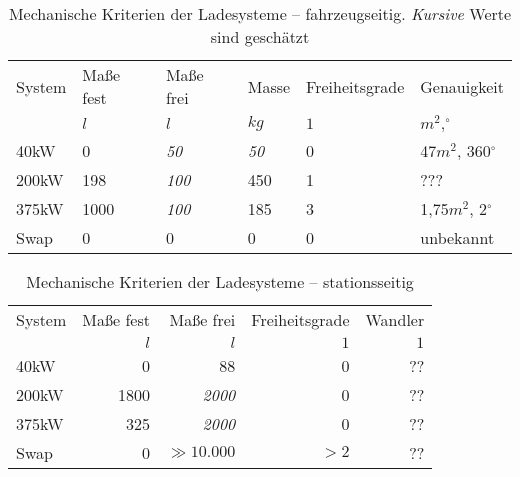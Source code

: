 \begin{table}[h!]\centering
	\begin{tabularx}{\linewidth}{Xlllll}
		\toprule
		System & Maße fest & Maße frei  & Masse     & Freiheitsgrade & Genauigkeit            \\
		       & $l$       & $l$        & $kg$      & $1$            & $m^2,^{\circ}$         \\ \midrule
		40kW   & 0         & \emph{50}  & \emph{50} & 0              & 47$m^2$, 360$^{\circ}$ \\
		200kW  & 198       & \emph{100} & 450       & 1              & ???                    \\
		375kW  & 1000      & \emph{100} & 185       & 3              & 1,75$m^2$, 2$^{\circ}$ \\
		Swap   & 0         & 0          & 0         & 0              & unbekannt             \\ \bottomrule
	\end{tabularx}
	\caption[Mechanische Kriterien der Ladesysteme – fahrzeugseitig]{Mechanische Kriterien der Ladesysteme – fahrzeugseitig. \emph{Kursive} Werte sind geschätzt}
	\label{tab_mech_Ladesys_fzg}
\end{table}

\begin{table}[h!]\centering
	\begin{tabularx}{\linewidth}{Xrrrr}
		\toprule
		System & Maße fest &   Maße frei & Freiheitsgrade & Wandler \\
		       &       $l$ &         $l$ &            $1$ &     $1$ \\ \midrule
		40kW   &         0 &          88 &              0 &      ?? \\
		200kW  &      1800 & \emph{2000} &              0 &      ?? \\
		375kW  &       325 & \emph{2000} &              0 &      ?? \\
		Swap   &         0 & $\gg10.000$ &           $>2$ &      ?? \\ \bottomrule
	\end{tabularx}
	\caption{Mechanische Kriterien der Ladesysteme – stationsseitig}
	\label{tab_mech_Ladesys_stat}
\end{table}
\FloatBarrier

